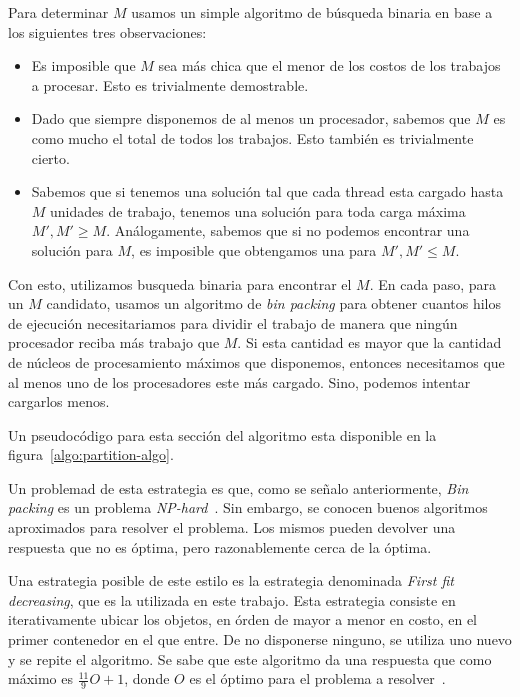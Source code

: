 Para determinar $M$ usamos un simple algoritmo de b\'usqueda binaria en base a los
siguientes tres observaciones:

\begin{itemize}
    \item Es imposible que $M$ sea m\'as chica que el menor de los costos de los
    trabajos a procesar. Esto es trivialmente demostrable.
    \item Dado que siempre disponemos de al menos un procesador, sabemos que $M$
    es como mucho el total de todos los trabajos. Esto tambi\'en es trivialmente
    cierto.
    \item Sabemos que si tenemos una soluci\'on tal que cada thread esta cargado
    hasta $M$ unidades de trabajo, tenemos una soluci\'on para toda carga m\'axima
    $M', M' \geq M$. An\'alogamente, sabemos que si no podemos encontrar una 
    soluci\'on para $M$, es imposible que obtengamos una para $M', M' \leq M$.
\end{itemize}

Con esto, utilizamos busqueda binaria para encontrar el $M$. En cada paso, para
un $M$ candidato, usamos un algoritmo de \textit{bin packing} para obtener 
cuantos hilos de ejecuci\'on necesitariamos para dividir el trabajo de manera que
ning\'un procesador reciba m\'as trabajo que $M$. Si esta cantidad es mayor que
la cantidad de n\'ucleos de procesamiento m\'aximos que disponemos, entonces 
necesitamos que al menos uno de los procesadores este m\'as cargado. Sino, podemos
intentar cargarlos menos.

Un pseudoc\'odigo para esta secci\'on del algoritmo esta disponible en la figura~\ref{algo:partition-algo}.

Un problemad de esta estrategia es que, como se se\~nalo anteriormente, 
\textit{Bin packing} es un problema \textit{NP-hard}~\cite{NPCompleteness}. Sin
embargo, se conocen buenos algoritmos aproximados para resolver el problema. Los
mismos pueden devolver una respuesta que no es \'optima, pero razonablemente cerca
de la \'optima.

Una estrategia posible de este estilo es la estrategia denominada \textit{First
fit decreasing}, que es la utilizada en este trabajo. Esta estrategia consiste en 
iterativamente ubicar los objetos, en \'orden de mayor a menor en costo, 
en el primer contenedor en el que entre. De no disponerse ninguno, se utiliza
uno nuevo y se repite el algoritmo. Se sabe que este algoritmo da una respuesta
que como m\'aximo es $\frac{11}{9} O + 1$, donde $O$ es el \'optimo para el 
problema a resolver~\cite{FFDDemo}.

